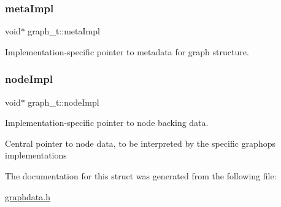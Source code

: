\subsubsection{\texorpdfstring{meta\+Impl}{metaImpl}}
{\footnotesize\ttfamily void$\ast$ graph\+\_\+t\+::meta\+Impl}



Implementation-\/specific pointer to metadata for graph structure. 

\mbox{\label{structgraph__t_a3bf6344f03f4cbc69345d026da2e3368}} 
\subsubsection{\texorpdfstring{node\+Impl}{nodeImpl}}
{\footnotesize\ttfamily void$\ast$ graph\+\_\+t\+::node\+Impl}



Implementation-\/specific pointer to node backing data. 

Central pointer to node data, to be interpreted by the specific graphops implementations 

The documentation for this struct was generated from the following file\+:\begin{DoxyCompactItemize}
\item 
\hyperlink{graphdata_8h}{graphdata.\+h}\end{DoxyCompactItemize}
